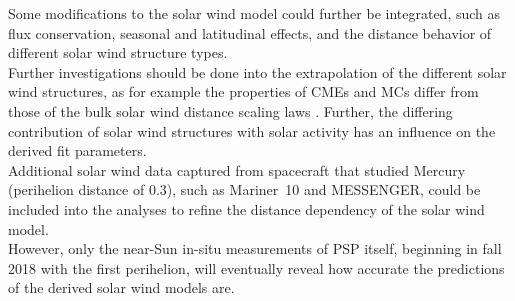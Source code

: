 Some modifications to the solar wind model could further be integrated, such as flux conservation, seasonal and latitudinal effects, and the distance behavior of different solar wind structure types.\\

Further investigations should be done into the extrapolation of the different solar wind structures, as for example the properties of CMEs and MCs differ from those of the bulk solar wind distance scaling laws \citep{Bothmer1998}. Further, the differing contribution of solar wind structures with solar activity has an influence on the derived fit parameters.\\

Additional solar wind data captured from spacecraft that studied Mercury (perihelion distance of \SI{0.3}{\au}), such as Mariner~10 and MESSENGER, could be included into the analyses to refine the distance dependency of the solar wind model.\\

However, only the near-Sun in-situ measurements of PSP itself, beginning in fall 2018 with the first perihelion, will eventually reveal how accurate the predictions of the derived solar wind models are.



